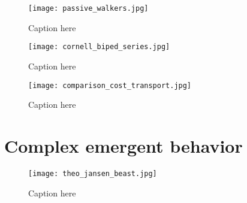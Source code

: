 \begin{figure}[]
\centering
    \hfil
    \caption{}
    \label{fig:mcgeer_work}
\end{figure}

\begin{figure}[]
    \begin{center}
        \texttt{[image: passive\_walkers.jpg]}
    \end{center}
    \caption{Caption here}
    \label{fig:figure1}
\end{figure}

\begin{figure}[]
    \begin{center}
        \texttt{[image: cornell\_biped\_series.jpg]}
    \end{center}
    \caption{Caption here}
    \label{fig:figure1}
\end{figure}

\begin{figure}[]
    \begin{center}
        \texttt{[image: comparison\_cost\_transport.jpg]}
    \end{center}
    \caption{Caption here}
    \label{fig:figure1}
\end{figure}



\section{Complex emergent behavior} %


\begin{figure}[]
\centering
    \hfil
    \hfil
    \caption{}
    \label{fig:}
\end{figure}


\begin{figure}[]
    \begin{center}
        \texttt{[image: theo\_jansen\_beast.jpg]}
    \end{center}
    \caption{Caption here}
    \label{fig:figure1}
\end{figure}





